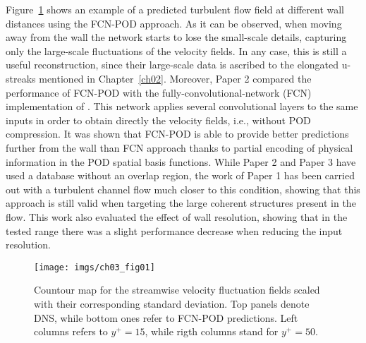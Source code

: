 Figure~\ref{ch03:fig01} shows an example of a predicted turbulent flow field at different wall distances using the FCN-POD approach.
As it can be observed, when moving away from the wall the network starts to lose the small-scale details, capturing only the large-scale fluctuations of the velocity fields.
In any case, this is still a useful reconstruction, since their large-scale data is ascribed to the elongated u-streaks mentioned in Chapter~\ref{ch02}.
Moreover, Paper 2 compared the performance of FCN-POD with the fully-convolutional-network (FCN) implementation of \citet{guastoni2020prediction}.
This network applies several convolutional layers to the same inputs in order to obtain directly the velocity fields, i.e., without POD compression.
It was shown that FCN-POD is able to provide better predictions further from the wall than FCN approach thanks to partial encoding of physical information in the POD spatial basis functions.
While Paper 2 and Paper 3 have used a database without an overlap region, the work of Paper 1 has been carried out with a turbulent channel flow much closer to this condition, showing that this approach is still valid when targeting the large coherent structures present in the flow.
This work also evaluated the effect of wall resolution, showing that in the tested range there was a slight performance decrease when reducing the input resolution.
\begin{figure}
  \centering
  \texttt{[image: imgs/ch03\_fig01]}
  \caption{\label{ch03:fig01}Countour map for the streamwise velocity fluctuation fields scaled with their corresponding standard deviation. Top panels denote DNS, while bottom ones refer to FCN-POD predictions. Left columns refers to $y^+=15$, while rigth columns stand for $y^+=50$.}
\end{figure}
